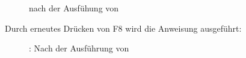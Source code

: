 
\clearpage


%


\begin{figure}[H]
\centering
{}
\caption{\olly nach der Ausfühung von \printf{}}
\label{fig:printf3_olly_3}
\end{figure}



\clearpage
Durch erneutes Drücken von F8 wird die Anweisung  ausgeführt:

\begin{figure}[H]
\centering
{}
\caption{\olly: Nach der Ausführung von }
\label{fig:printf3_olly_4}
\end{figure}



